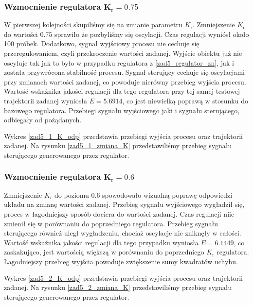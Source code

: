 \subsubsection{Wzmocnienie regulatora $\mathbf{K_{\mathrm{r}}}=\num{0,75}$}
W pierwszej kolejności skupiliśmy się na zmianie parametru $K_{\mathrm{r}}$.
Zmniejszenie $K_{\mathrm{r}}$ do wartości $\num{0.75}$ sprawiło że pozbyliśmy się oscylacji. Czas regulacji
wyniósł około 100 próbek. Dodatkowo, sygnał wyjściowy procesu nie cechuje się przeregulowaniem,
czyli przekroczenie wartości zadanej. Wyjście obiektu już nie oscyluje tak jak to było w przypadku regulatora z \ref{zad5_regulator_zn},
jak i została przywrócona stabilność procesu. Sygnał sterujący cechuje się oscylacjami przy zmianach
wartości zadanej, co powoduje nierówny przebieg wyjścia procesu.
Wartość wskaźnika jakości regulacji dla tego regulatora przy tej samej
testowej trajektorii zadanej wyniosła $E=\num{5,6914}$, co jest niewielką poprawą w stosunku 
do bazowego regulatora.
Przebiegi sygnału wyjściowego jaki i sygnału sterującego, odbiegały od pożądanych.

Wykres \ref{zad5_1_K_odp} przedstawia przebiegi wyjścia procesu oraz trajektorii zadanej.
Na rysunku \ref{zad5_1_zmiana_K} przedstawiliśmy przebieg sygnału sterującego generowanego przez regulator.

\subsubsection{Wzmocnienie regulatora $\mathbf{K_{\mathrm{r}}}=\num{0,6}$}
Zmniejszenie $K_{\mathrm{r}}$ do poziomu $\num{0,6}$ spowodowało wizualną poprawę odpowiedzi układu 
na zmianę wartości zadanej. Przebieg sygnału wyjściowego wygładził się, proces w łagodniejszy sposób
dociera do wartości zadanej. Czas regulacji niie zmienił się w porównaniu do poprzedniego regulatora.
Przebieg sygnału sterującego również uległ wygładzeniu, chociaż oscylacje nie zniknęły w całości.
Wartość wskaźnika jakości regulacji dla tego 
przypadku wyniosła $E=\num{6.1449}$, co zaskakująco, jest wartością większą w porównaniu do poprzedniego 
$K_{\mathrm{r}}$ regulatora. Łagodniejszy przebieg wyjścia powoduje zwiększenie sumy kwadratów uchybu.

Wykres \ref{zad5_2_K_odp} przedstawia przebiegi wyjścia procesu oraz trajektorii zadanej.
Na rysunku \ref{zad5_2_zmiana_K} przedstawiliśmy przebieg sygnału sterującego generowanego przez regulator.

